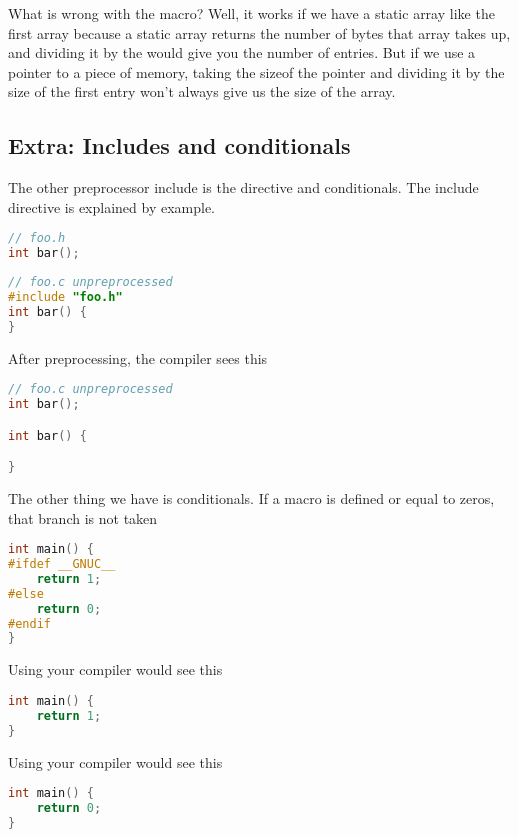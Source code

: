 What is wrong with the macro? Well, it works if we have a static array like the first array because  a static array returns the number of bytes that array takes up, and dividing it by the  would give you the number of entries.
But if we use a pointer to a piece of memory, taking the sizeof the pointer and dividing it by the size of the first entry won't always give us the size of the array.

\subsection{Extra: Includes and conditionals}

The other preprocessor include is the  directive and conditionals.
The include directive is explained by example.

\begin{lstlisting}[language=C]
// foo.h
int bar();
\end{lstlisting}

\begin{lstlisting}[language=C]
// foo.c unpreprocessed
#include "foo.h"
int bar() {
}
\end{lstlisting}

After preprocessing, the compiler sees this

\begin{lstlisting}[language=C]
// foo.c unpreprocessed
int bar();

int bar() {

}
\end{lstlisting}

The other thing we have is conditionals.
If a macro is defined or equal to zeros, that branch is not taken

\begin{lstlisting}[language=C]
int main() {
#ifdef __GNUC__
    return 1;
#else
    return 0;
#endif
}
\end{lstlisting}

Using  your compiler would see this

\begin{lstlisting}[language=C]
int main() {
    return 1;
}
\end{lstlisting}


Using  your compiler would see this

\begin{lstlisting}[language=C]
int main() {
    return 0;
}
\end{lstlisting}

